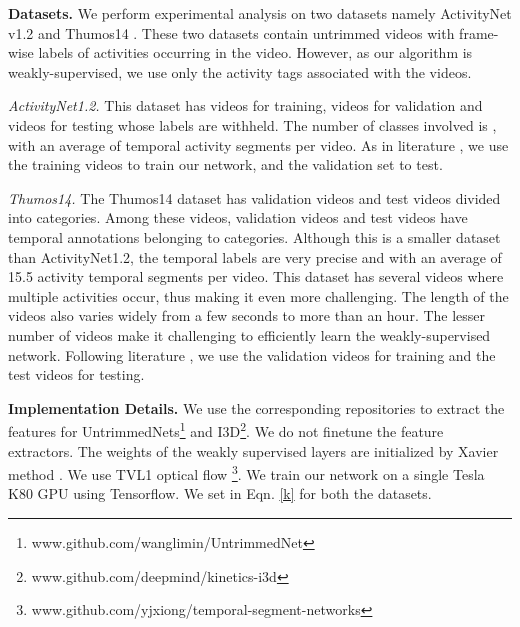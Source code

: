 \documentclass[runningheads]{llncs}
\begin{document}
\textbf{Datasets.} 
We perform experimental analysis on two datasets namely ActivityNet v1.2 \cite{heilbron2015activitynet} and Thumos14 \cite{idrees2017thumos}. These two datasets contain untrimmed videos with frame-wise labels of activities occurring in the video. However, as our algorithm is weakly-supervised, we use only the activity tags associated with the videos.

\textit{ActivityNet1.2.} This dataset has  videos for training,  videos for validation and  videos for testing whose labels are withheld. The number of classes involved is , with an average of  temporal activity segments per video. As in literature \cite{wang2017untrimmednets,nguyen2017weakly}, we use the training videos to train our network, and the validation set to test. 

\textit{Thumos14.} The Thumos14 dataset has  validation videos and  test videos divided into  categories. Among these videos,  validation videos and  test videos have temporal annotations belonging to  categories. Although this is a smaller dataset than ActivityNet1.2, the temporal labels are very precise and with an average of 15.5 activity temporal segments per video. This dataset has several videos where multiple activities occur, thus making it even more challenging. The length of the videos also varies widely from a few seconds to more than an hour. The lesser number of videos make it challenging to efficiently learn the weakly-supervised network. Following literature \cite{wang2017untrimmednets,nguyen2017weakly}, we use the validation videos for training and the test videos for testing.


\textbf{Implementation Details.} We use the corresponding repositories to extract the features for UntrimmedNets\footnote{www.github.com/wanglimin/UntrimmedNet} and I3D\footnote{www.github.com/deepmind/kinetics-i3d}. We do not finetune the feature extractors. The weights of the weakly supervised layers are initialized by Xavier method \cite{glorot2010understanding}. We use TVL1 optical flow  \footnote{www.github.com/yjxiong/temporal-segment-networks}. We train our network on a single Tesla K80 GPU using Tensorflow. We set  in Eqn. \ref{k} for both the datasets.
\end{document}

